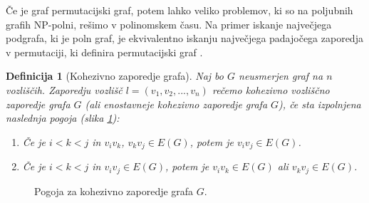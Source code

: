 \documentclass[a4paper, 12pt]{book}
\newtheorem{definicija}{Definicija}[chapter]
\begin{document}
Če je graf permutacijski graf, potem lahko veliko problemov, ki so na poljubnih grafih NP-polni, rešimo v polinomskem času. Na primer iskanje največjega podgrafa, ki je poln graf, je ekvivalentno iskanju največjega padajočega zaporedja v permutaciji, ki definira permutacijski graf \cite{algorithmGraphTheoryAndPerfectGraphs}.

\begin{definicija}[Kohezivno zaporedje grafa]
\label{def_kohezivno_zaporedje}
    Naj bo $G$ neusmerjen graf na $n$ vozliščih. 
    Zaporedju vozlišč $l = (v_1, v_2, ..., v_n)$ rečemo kohezivno vozliščno zaporedje grafa $G$ (ali enostavneje kohezivno zaporedje grafa $G$), če sta izpolnjena naslednja pogoja (slika \ref{graf_kohezivno_zaporedje_ab}):
    \begin{enumerate}[label=(\alph*)]
        \item Če je $i < k < j$ in $v_iv_k$, $v_kv_j \in E(G)$, potem je $v_iv_j \in E(G)$.
        \item Če je $i < k < j$ in $v_iv_j \in E(G)$, potem je $v_iv_k \in E(G)$ ali $v_kv_j \in E(G)$.
    \end{enumerate}
\end{definicija}

\begin{figure}[h]
    \begin{center}        
    \end{center}
    \caption{Pogoja za kohezivno zaporedje grafa $G$.}
    \label{graf_kohezivno_zaporedje_ab}
\end{figure}
\end{document}
